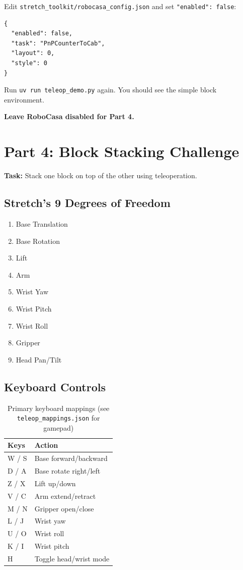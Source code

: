 \documentclass[11pt,a4paper]{article}
\begin{document}
Edit \texttt{stretch\_toolkit/robocasa\_config.json} and set \texttt{"enabled": false}:

\begin{lstlisting}
{
  "enabled": false,
  "task": "PnPCounterToCab",
  "layout": 0,
  "style": 0
}
\end{lstlisting}

Run \texttt{uv run teleop\_demo.py} again. You should see the simple block environment.

\textbf{Leave RoboCasa disabled for Part 4.}

\section{Part 4: Block Stacking Challenge}

\textbf{Task:} Stack one block on top of the other using teleoperation.

\subsection{Stretch's 9 Degrees of Freedom}

\begin{enumerate}
    \item Base Translation
    \item Base Rotation
    \item Lift
    \item Arm
    \item Wrist Yaw
    \item Wrist Pitch
    \item Wrist Roll
    \item Gripper
    \item Head Pan/Tilt
\end{enumerate}

\subsection{Keyboard Controls}

\begin{table}[H]
\centering
\begin{tabular}{|l|l|}
\hline
\textbf{Keys} & \textbf{Action} \\
\hline
W / S & Base forward/backward \\
D / A & Base rotate right/left \\
Z / X & Lift up/down \\
V / C & Arm extend/retract \\
M / N & Gripper open/close \\
L / J & Wrist yaw \\
U / O & Wrist roll \\
K / I & Wrist pitch \\
H & Toggle head/wrist mode \\
\hline
\end{tabular}
\caption{Primary keyboard mappings (see \texttt{teleop\_mappings.json} for gamepad)}
\end{table}
\end{document}
